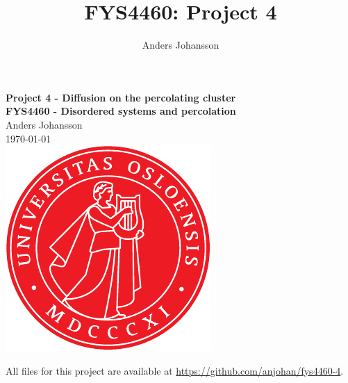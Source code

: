 \documentclass[11pt,british,a4paper]{report}
\begin{document}
\title{FYS4460: Project 4}
\author{Anders Johansson}

\begin{titlepage}
\vspace*{\fill}
\begin{center}
\textsf{
    \Huge \textbf{Project 4 - Diffusion on the percolating cluster}\\\vspace{0.5cm}
    \Large \textbf{FYS4460 - Disordered systems and percolation}\\
    \vspace{8cm}
    Anders Johansson\\
    \today\\
}
\vspace{1.5cm}
\includegraphics{uio.pdf}\\
\vspace*{\fill}
\end{center}
\end{titlepage}
\null
\pagestyle{empty}
\newpage

\pagestyle{fancy}
\setcounter{page}{1}

All files for this project are available at \url{https://github.com/anjohan/fys4460-4}.
\end{document}
